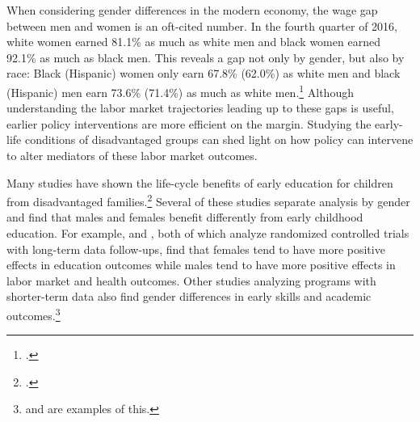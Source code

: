 When considering gender differences in the modern economy, the wage gap between men and women is an oft-cited number. In the fourth quarter of 2016, white women earned 81.1\% as much as white men and black women earned 92.1\% as much as black men. This reveals a gap not only by gender, but also by race: Black (Hispanic) women only earn 67.8\% (62.0\%) as white men and black (Hispanic) men earn 73.6\% (71.4\%) as much as white men.\footnote{\citet{USDPTL_2017_Wage_News-Release}.} Although understanding the labor market trajectories leading up to these gaps is useful, earlier policy interventions are more efficient on the margin. Studying the early-life conditions of disadvantaged groups can shed light on how policy can intervene to alter mediators of these labor market outcomes.

Many studies have shown the life-cycle benefits of early education for children from disadvantaged families.\footnote{\citet{Elango_Hojman_etal_2016_Early-Edu}.} Several of these studies separate analysis by gender and find that males and females benefit differently from early childhood education. For example, \citet{Heckman_Moon_etal_2010_QE} and \citet{Garcia_etal_2016_Comp_CBA_Unpublished}, both of which analyze randomized controlled trials with long-term data follow-ups, find that females tend to have more positive effects in education outcomes while males tend to have more positive effects in labor market and health outcomes. Other studies analyzing programs with shorter-term data also find gender differences in early skills and academic outcomes.\footnote{\citet{Deming_2009_AEJAE} and \citet{Ou_Reynolds_2010_Mechanisms_CYSR} are examples of this.} 

